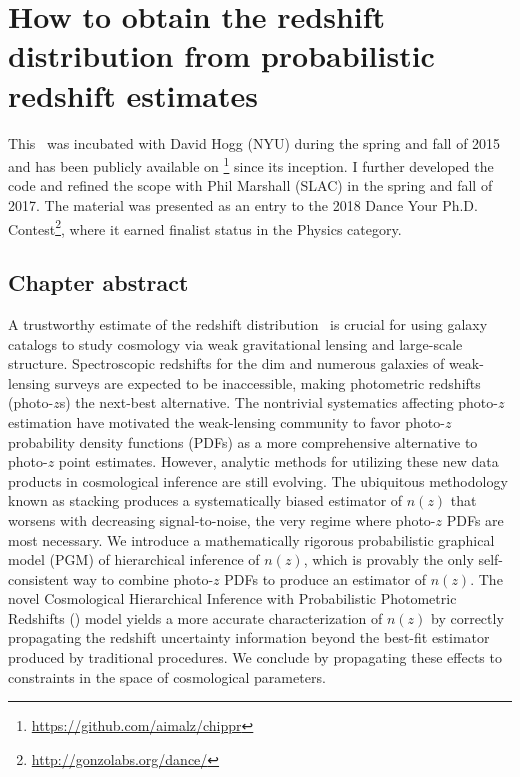 \renewcommand{\chapid}{chippr}

\newcommand{\cosmolike}{\repo{CosmoLike}}
\newcommand{\emcee}{\repo{emcee}}
\newcommand{\boss}{\project{BOSS}}
\newcommand{\mmle}{marginalized maximum likelihood estimate}%


\chapter{ How to obtain the redshift distribution from probabilistic redshift estimates  }

This \paper\ was incubated with David Hogg (NYU) during the spring and fall of 2015 and has been publicly available on \github\footnote{\url{https://github.com/aimalz/chippr}} since its inception.
I further developed the code and refined the scope with Phil Marshall (SLAC) in the spring and fall of 2017.
The material was presented as an entry \citep{malz_probabilistic_nodate} to the 2018 Dance Your Ph.D. Contest\footnote{\url{http://gonzolabs.org/dance/}}, where it earned finalist status in the Physics category.

\section*{Chapter abstract}

A trustworthy estimate of the redshift distribution \nz\ is crucial for using galaxy catalogs to study cosmology via weak gravitational lensing and large-scale structure.
Spectroscopic redshifts for the dim and numerous galaxies of weak-lensing surveys are expected to be inaccessible, making photometric redshifts (photo-$z$s) the next-best alternative.
The nontrivial systematics affecting photo-$z$ estimation have motivated the weak-lensing community to favor photo-$z$ probability density functions (PDFs) as a more comprehensive alternative to photo-$z$ point estimates.
However, analytic methods for utilizing these new data products in cosmological inference are still evolving.
The ubiquitous methodology known as stacking produces a systematically biased estimator of $n(z)$ that worsens with decreasing signal-to-noise, the very regime where photo-$z$ PDFs are most necessary.
We introduce a mathematically rigorous probabilistic graphical model (PGM) of hierarchical inference of $n(z)$, which is provably the only self-consistent way to combine photo-$z$ PDFs to produce an estimator of $n(z)$.
The novel Cosmological Hierarchical Inference with Probabilistic Photometric Redshifts (\Chippr) model yields a more accurate characterization of $n(z)$ by correctly propagating the redshift uncertainty information beyond the best-fit estimator produced by traditional procedures.
We conclude by propagating these effects to constraints in the space of cosmological parameters.

